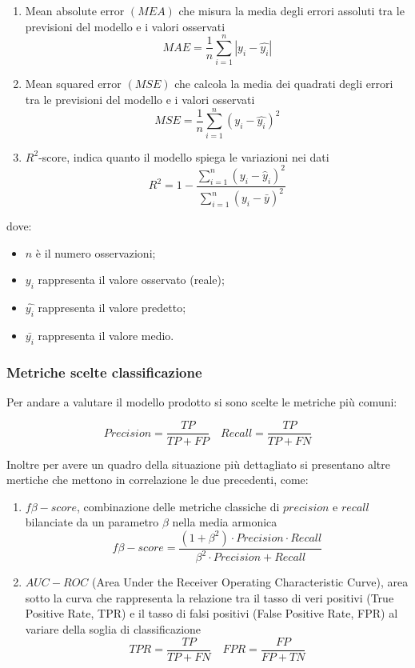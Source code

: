 \documentclass[italian,12pt,a4paper]{article}
\begin{document}
	\begin{enumerate}
		\item Mean absolute error $(MEA)$ che misura la media degli errori assoluti tra le previsioni del modello e i valori osservati $$MAE = \frac{1}{n}\sum_{i = 1}^{n}|y_i - \hat{y_i}|$$
		\item Mean squared error $(MSE)$ che calcola la media dei quadrati degli errori tra le previsioni del modello e i valori osservati $$MSE = \frac{1}{n}\sum_{i = 1}^{n}(y_i - \hat{y_i})^2$$
		\item $R^2$-score, indica quanto il modello spiega le variazioni nei dati $$R^2 = 1 - \frac{\sum_{i=1}^{n}(y_i - \hat{y}_i)^2}{\sum_{i=1}^{n}(y_i - \bar{y})^2} $$
	\end{enumerate}
	
	dove:
	\begin{itemize}
		\item $n$ è il numero osservazioni;
		\item $y_i$ rappresenta il valore osservato (reale);
		\item $\hat{y_i}$ rappresenta il valore predetto;
		\item $\bar{y_i}$ rappresenta il valore medio.
	\end{itemize}

	
	\subsubsection{Metriche scelte classificazione}
	Per andare a valutare il modello prodotto si sono scelte le metriche più comuni:
	
	$$Precision = \frac{TP}{TP+FP} \quad Recall = \frac{TP}{TP+FN}$$

	Inoltre per avere un quadro della situazione più dettagliato si presentano altre mertiche che mettono in correlazione le due precedenti, come:
	
		
	\begin{enumerate}
		\item $f\beta-score$,  combinazione delle metriche classiche di $precision$ e $recall$ bilanciate da un parametro $\beta$ nella media armonica
		$$f\beta-score = \frac{(1+ \beta^2) \cdot Precision \cdot Recall}{\beta^2 \cdot Precision + Recall}$$
		\item $AUC-ROC$ (Area Under the Receiver Operating Characteristic Curve), area sotto la curva che rappresenta la relazione tra il tasso di veri positivi (True Positive Rate, TPR) e il tasso di falsi positivi (False Positive Rate, FPR) al variare della soglia di classificazione
		$$TPR = \frac{TP}{TP+FN} \quad FPR = \frac{FP}{FP+TN}$$
	
	\end{enumerate} 
\end{document}

